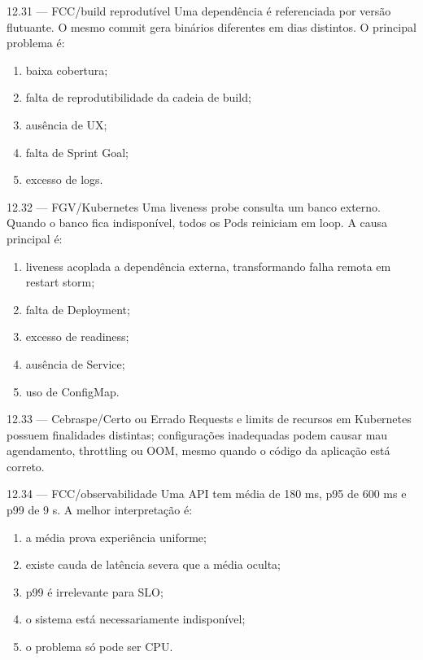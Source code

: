 \begin{questao}{ 12.31 — FCC/build reprodutível}
Uma dependência é referenciada por versão flutuante. O mesmo commit gera binários diferentes em dias distintos. O principal problema é:
\begin{enumerate}[label=\Alph*)]
\item baixa cobertura;
\item falta de reprodutibilidade da cadeia de build;
\item ausência de UX;
\item falta de Sprint Goal;
\item excesso de logs.
\end{enumerate}
\end{questao}

\begin{questao}{ 12.32 — FGV/Kubernetes}
Uma liveness probe consulta um banco externo. Quando o banco fica indisponível, todos os Pods reiniciam em loop. A causa principal é:
\begin{enumerate}[label=\Alph*)]
\item liveness acoplada a dependência externa, transformando falha remota em restart storm;
\item falta de Deployment;
\item excesso de readiness;
\item ausência de Service;
\item uso de ConfigMap.
\end{enumerate}
\end{questao}

\begin{questao}{ 12.33 — Cebraspe/Certo ou Errado}
Requests e limits de recursos em Kubernetes possuem finalidades distintas; configurações inadequadas podem causar mau agendamento, throttling ou OOM, mesmo quando o código da aplicação está correto.
\end{questao}

\begin{questao}{ 12.34 — FCC/observabilidade}
Uma API tem média de 180 ms, p95 de 600 ms e p99 de 9 s. A melhor interpretação é:
\begin{enumerate}[label=\Alph*)]
\item a média prova experiência uniforme;
\item existe cauda de latência severa que a média oculta;
\item p99 é irrelevante para SLO;
\item o sistema está necessariamente indisponível;
\item o problema só pode ser CPU.
\end{enumerate}
\end{questao}

